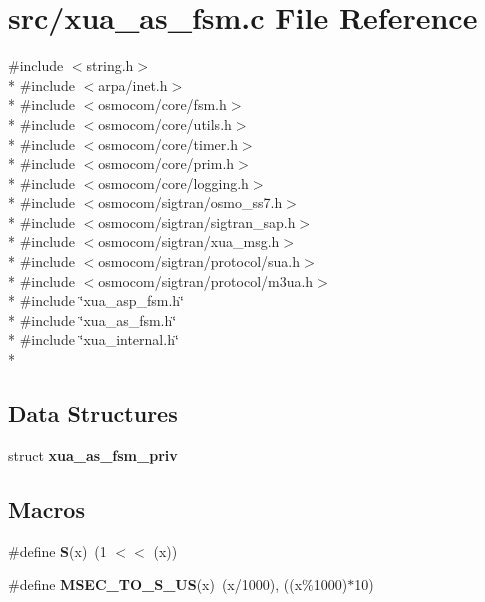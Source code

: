 \section{src/xua\+\_\+as\+\_\+fsm.c File Reference}
\label{xua__as__fsm_8c}
{\ttfamily \#include $<$string.\+h$>$}\\*
{\ttfamily \#include $<$arpa/inet.\+h$>$}\\*
{\ttfamily \#include $<$osmocom/core/fsm.\+h$>$}\\*
{\ttfamily \#include $<$osmocom/core/utils.\+h$>$}\\*
{\ttfamily \#include $<$osmocom/core/timer.\+h$>$}\\*
{\ttfamily \#include $<$osmocom/core/prim.\+h$>$}\\*
{\ttfamily \#include $<$osmocom/core/logging.\+h$>$}\\*
{\ttfamily \#include $<$osmocom/sigtran/osmo\+\_\+ss7.\+h$>$}\\*
{\ttfamily \#include $<$osmocom/sigtran/sigtran\+\_\+sap.\+h$>$}\\*
{\ttfamily \#include $<$osmocom/sigtran/xua\+\_\+msg.\+h$>$}\\*
{\ttfamily \#include $<$osmocom/sigtran/protocol/sua.\+h$>$}\\*
{\ttfamily \#include $<$osmocom/sigtran/protocol/m3ua.\+h$>$}\\*
{\ttfamily \#include \char`\"{}xua\+\_\+asp\+\_\+fsm.\+h\char`\"{}}\\*
{\ttfamily \#include \char`\"{}xua\+\_\+as\+\_\+fsm.\+h\char`\"{}}\\*
{\ttfamily \#include \char`\"{}xua\+\_\+internal.\+h\char`\"{}}\\*
\subsection*{Data Structures}
\begin{DoxyCompactItemize}
\item 
struct {\bf xua\+\_\+as\+\_\+fsm\+\_\+priv}
\end{DoxyCompactItemize}
\subsection*{Macros}
\begin{DoxyCompactItemize}
\item 
\#define {\bf S}(x)~(1 $<$$<$ (x))
\item 
\#define {\bf M\+S\+E\+C\+\_\+\+T\+O\+\_\+\+S\+\_\+\+US}(x)~(x/1000), ((x\%1000)$\ast$10)
\end{DoxyCompactItemize}
